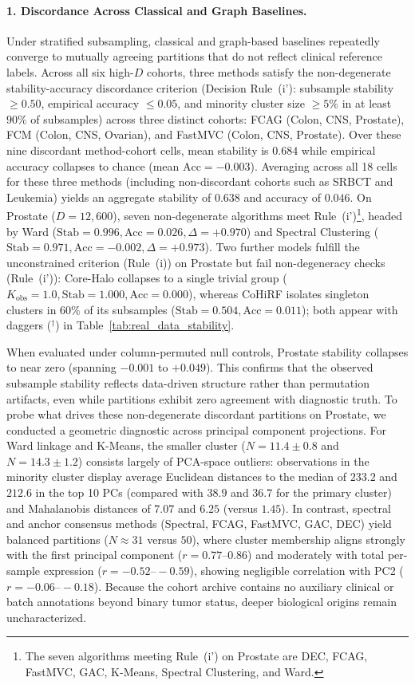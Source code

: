 \documentclass[pdflatex,sn-mathphys-num]{sn-jnl}
\theoremstyle{thmstyleone}
\theoremstyle{thmstyletwo}
\theoremstyle{thmstylethree}
\begin{document}
\paragraph{1. Discordance Across Classical and Graph Baselines.}
Under stratified subsampling, classical and graph-based baselines repeatedly converge to mutually agreeing partitions that do not reflect clinical reference labels. Across all six high-$D$ cohorts, three methods satisfy the non-degenerate stability-accuracy discordance criterion (Decision Rule~(i'): subsample stability $\ge 0.50$, empirical accuracy $\le 0.05$, and minority cluster size $\ge 5\%$ in at least $90\%$ of subsamples) across three distinct cohorts: FCAG (Colon, CNS, Prostate), FCM (Colon, CNS, Ovarian), and FastMVC (Colon, CNS, Prostate). Over these nine discordant method-cohort cells, mean stability is $0.684$ while empirical accuracy collapses to chance (mean $\text{Acc} = -0.003$). Averaging across all 18 cells for these three methods (including non-discordant cohorts such as SRBCT and Leukemia) yields an aggregate stability of $0.638$ and accuracy of $0.046$. On Prostate ($D=12{,}600$), seven non-degenerate algorithms meet Rule~(i')\footnote{The seven algorithms meeting Rule~(i') on Prostate are DEC, FCAG, FastMVC, GAC, K-Means, Spectral Clustering, and Ward.}, headed by Ward ($\text{Stab}=0.996, \text{Acc}=0.026, \Delta=+0.970$) and Spectral Clustering ($\text{Stab}=0.971, \text{Acc}=-0.002, \Delta=+0.973$). Two further models fulfill the unconstrained criterion (Rule~(i)) on Prostate but fail non-degeneracy checks (Rule~(i')): Core-Halo collapses to a single trivial group ($K_{\text{obs}}=1.0, \text{Stab}=1.000, \text{Acc}=0.000$), whereas CoHiRF isolates singleton clusters in $60\%$ of its subsamples ($\text{Stab}=0.504, \text{Acc}=0.011$); both appear with daggers ($^\dagger$) in Table~\ref{tab:real_data_stability}.

When evaluated under column-permuted null controls, Prostate stability collapses to near zero (spanning $-0.001$ to $+0.049$). This confirms that the observed subsample stability reflects data-driven structure rather than permutation artifacts, even while partitions exhibit zero agreement with diagnostic truth. To probe what drives these non-degenerate discordant partitions on Prostate, we conducted a geometric diagnostic across principal component projections. For Ward linkage and K-Means, the smaller cluster ($N=11.4 \pm 0.8$ and $N=14.3 \pm 1.2$) consists largely of PCA-space outliers: observations in the minority cluster display average Euclidean distances to the median of $233.2$ and $212.6$ in the top 10 PCs (compared with $38.9$ and $36.7$ for the primary cluster) and Mahalanobis distances of $7.07$ and $6.25$ (versus $1.45$). In contrast, spectral and anchor consensus methods (Spectral, FCAG, FastMVC, GAC, DEC) yield balanced partitions ($N \approx 31$ versus $50$), where cluster membership aligns strongly with the first principal component ($r = 0.77\text{--}0.86$) and moderately with total per-sample expression ($r = -0.52\text{--}-0.59$), showing negligible correlation with PC2 ($r = -0.06\text{--}-0.18$). Because the cohort archive contains no auxiliary clinical or batch annotations beyond binary tumor status, deeper biological origins remain uncharacterized.
\end{document}
